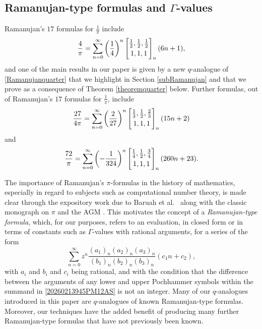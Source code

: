 \documentclass[12pt]{article}
\begin{document}
\subsection{Ramanujan-type formulas and $\Gamma$-values} 
 Ramanujan's $17$ formulas for $\frac{1}{\pi}$ \cite[pp.\ 352--354]{Berndt1994} \cite{Ramanujan1914} include 
\begin{equation}\label{Ramanujanquarter}
 \frac{4}{\pi} = 
 \sum_{n = 0}^{\infty} 
 \left( \frac{1}{4} \right)^{n} \left[ \begin{matrix} 
 \frac{1}{2}, \frac{1}{2}, \frac{1}{2} 
 \vspace{1mm} \\ 
 1, 1, 1
 \end{matrix} \right]_{n} (6 n + 1), 
 \end{equation}
 and one of the main results in our paper is given by a new 
 $q$-analogue of \eqref{Ramanujanquarter} 
 that we highlight in Section \ref{subRamanujan}
 and that we prove as a consequence of Theorem \ref{theoremquarter} below. 
 Further formulas, out of Ramanujan's $17$ formulas for $\frac{1}{\pi}$, include
 $$ \frac{27}{4\pi} = \sum_{n = 0}^{\infty} 
 \left( \frac{2}{27} \right)^{n} \left[ \begin{matrix} 
 \frac{1}{3}, \frac{1}{2}, \frac{2}{3} 
 \vspace{1mm} \\ 
 1, 1, 1
 \end{matrix} \right]_{n} (15 n + 2) 
 $$ and 
 $$ \frac{72}{\pi} = \sum_{n = 0}^{\infty} 
 \left( -\frac{1}{324} \right)^{n} \left[ \begin{matrix} 
 \frac{1}{4}, \frac{1}{2}, \frac{3}{4} 
 \vspace{1mm} \\ 
 1, 1, 1
 \end{matrix} \right]_{n} (260 n + 23). $$

 The importance of Ramanujan's $\pi$-formulas in the history of mathematics, especially in regard to subjects such as computational 
 number theory, is made clear through the expository work 
 due to Baruah et al.\ \cite{BaruahBerndtChan2009}
 along with the classic monograph on $\pi$ and the AGM \cite{BorweinBorwein1987}. 
 This motivates the concept of a 
 \emph{Ramanujan-type formula}, which, for our purposes, refers to 
 an evaluation, in closed form or in terms of constants such as $\Gamma$-values with rational arguments, 
 for a series of the form 
\begin{equation}\label{20260213945PM12AS}
 \sum_{n=0}^{\infty} z^n \frac{ (a_{1})_{n} (a_{2})_{n} (a_{3})_{n} }{ 
 (b_{1})_{n} (b_{2})_{n} (b_{3})_{n} } (c_{1} n + c_2), 
\end{equation}
 with $a_i$ and $b_i$ and $c_i$ being rational, 
 and with the condition that 
 the difference between the arguments of any lower 
 and upper Pochhammer symbols within the summand in \eqref{20260213945PM12AS} is not an integer. 
 Many of our $q$-analogues introduced in this paper
 are $q$-analogues of known Ramanujan-type formulas. 
 Moreover, our techniques have the added benefit of producing
 many further Ramanujan-type formulas that have not previously been known. 
\end{document}
